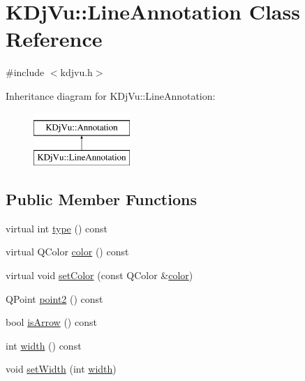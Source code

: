 \hypertarget{classKDjVu_1_1LineAnnotation}{\section{K\+Dj\+Vu\+:\+:Line\+Annotation Class Reference}
\label{classKDjVu_1_1LineAnnotation}
}


{\ttfamily \#include $<$kdjvu.\+h$>$}

Inheritance diagram for K\+Dj\+Vu\+:\+:Line\+Annotation\+:\begin{figure}[H]
\begin{center}
\leavevmode
\includegraphics[height=2.000000cm]{classKDjVu_1_1LineAnnotation}
\end{center}
\end{figure}
\subsection*{Public Member Functions}
\begin{DoxyCompactItemize}
\item 
virtual int \hyperlink{classKDjVu_1_1LineAnnotation_a02b3c6d99ad38e7e9c2af1822aec0e18}{type} () const 
\item 
virtual Q\+Color \hyperlink{classKDjVu_1_1LineAnnotation_a6fe74ea84923ac93aede6368b6ee0a19}{color} () const 
\item 
virtual void \hyperlink{classKDjVu_1_1LineAnnotation_ac17bb42fe8e9826259be0b702e6fff8a}{set\+Color} (const Q\+Color \&\hyperlink{classKDjVu_1_1LineAnnotation_a6fe74ea84923ac93aede6368b6ee0a19}{color})
\item 
Q\+Point \hyperlink{classKDjVu_1_1LineAnnotation_a08e6e79074f48a01d9c83cded0df4a20}{point2} () const 
\item 
bool \hyperlink{classKDjVu_1_1LineAnnotation_ad7c9f1952c587dc4794fb232910d776e}{is\+Arrow} () const 
\item 
int \hyperlink{classKDjVu_1_1LineAnnotation_a0e013dce3ee7bf74b86a70d6ab4a82ed}{width} () const 
\item 
void \hyperlink{classKDjVu_1_1LineAnnotation_a5d0a0e6f951690f6a15415cdb8086665}{set\+Width} (int \hyperlink{classKDjVu_1_1LineAnnotation_a0e013dce3ee7bf74b86a70d6ab4a82ed}{width})
\end{DoxyCompactItemize}
